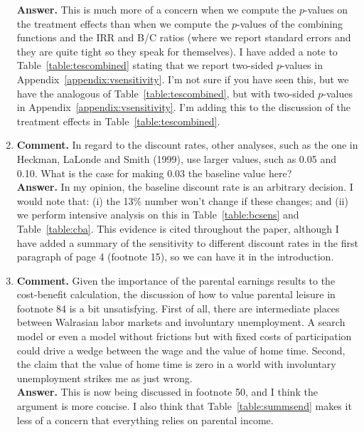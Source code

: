 \begin{enumerate}
\noindent \textbf{Answer.} This is much more of a concern when we compute the $p$-values on the treatment effects than when we compute the $p$-values of the combining functions and the IRR and B/C ratios (where we report standard errors and they are quite tight so they speak for themselves). I have added a note to Table~\ref{table:tescombined} stating that we report two-sided $p$-values in Appendix~\ref{appendix:vsensitivity}. I'm not sure if you have seen this, but we have the analogous of Table~\ref{table:tescombined}, but with two-sided $p$-values in Appendix~\ref{appendix:vsensitivity}. I'm adding this to the discussion of the treatment effects in Table~\ref{table:tescombined}.\\

\item
\noindent \textbf{Comment.} In regard to the discount rates, other analyses, such as the one in Heckman, LaLonde and Smith (1999), use larger values, such as 0.05 and 0.10. What is the case for making 0.03 the baseline value here? \\

\noindent \textbf{Answer.} In my opinion, the baseline discount rate is an arbitrary decision. I would note that: (i) the 13\% number won't change if these changes; and (ii) we perform intensive analysis on this in Table~\ref{table:bcsens} and Table~\ref{table:cba}. This evidence is cited throughout the paper, although I have added a summary of the sensitivity to different discount rates in the first paragraph of page 4 (footnote 15), so we can have it in the introduction.\\

\item
\noindent \textbf{Comment.} Given the importance of the parental earnings results to the cost-benefit calculation, the discussion of how to value parental leisure in footnote 84 is a bit unsatisfying. First of all, there are intermediate places between Walrasian labor markets and involuntary unemployment. A search model or even a model without frictions but with fixed costs of participation could drive a wedge between the wage and the value of home time. Second, the claim that the value of home time is zero in a world with involuntary unemployment strikes me as just wrong.\\ 

\noindent \textbf{Answer.} This is now being discussed in footnote 50, and I think the argument is more concise. I also think that Table~\ref{table:summsend} makes it less of a concern that everything relies on parental income.\\


\end{enumerate}
